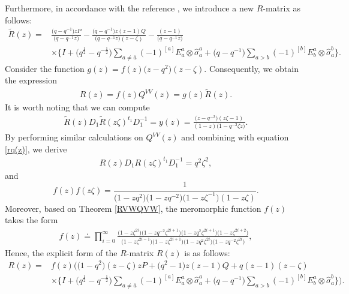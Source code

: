 \documentclass[pdftex]{sigma}
\numberwithin{equation}{section}
\begin{document}
Furthermore, in accordance with the reference \cite{MKMJ}, we introduce a new $R$-matrix as follows:
\begin{align}\label{R1}
 \widetilde{R}(z)={}&\frac{\bigl(q-q^{-1}\bigr)zP}{\bigl(q-q^{-1}z\bigr)}-\frac{\bigl(q-q^{-1}\bigr)z(z-1)Q}{\bigl(q-q^{-1}z\bigr)(z-\zeta)}-\frac{(z-1)}{\bigl(q-q^{-1}z\bigr)}
\nonumber\\
 &\times\biggl\{I+\bigl(q^{\frac{1}{2}}-q^{-\frac{1}{2}}\bigr)\sum\limits_{a\neq \overline{a}}(-1)^{[a]}E^a_a\otimes\hat{\sigma}^a_a+\bigl(q-q^{-1}\bigr)\sum\limits_{a> b}(-1)^{[b]}E^a_b\otimes \hat{\sigma}^b_a\biggr\}.
\end{align}
Consider the function $g(z)=f(z)\bigl(z-q^2\bigr)(z-\zeta)$. Consequently, we obtain the expression
\begin{gather}\label{rq(z)}
 R(z)=f(z)Q^{VV}(z)=g(z)\widetilde{R}(z).
\end{gather}
It is worth noting that we can compute
\begin{gather}
\label{d7}
 \widetilde{R}(z)D_1\widetilde{R}(z\zeta)^{t_1}D_1^{-1}=y(z)=\frac{\bigl(z-q^{-2}\bigr)(z\zeta-1)}{(1-z)\bigl(1-q^{-2}\zeta z\bigr)}.
\end{gather}
By performing similar calculations on $Q^{VV}(z)$ and combining with equation \eqref{rq(z)}, we derive
\begin{gather}\label{d6}
R(z)D_1R(z\zeta)^{t_1}D_1^{-1}=q^2\zeta^2,
\end{gather}
and
\[
 f(z)f(z\zeta)=\frac{1}{\bigl(1-zq^2\bigr)\bigl(1-zq^{-2}\bigr)\bigl(1-z\zeta^{-1}\bigr)(1-z\zeta)}.
\]
Moreover, based on Theorem \ref{RVWQVW}, the meromorphic function $f(z)$ takes the form
\begin{gather*}
 f(z)\doteq \prod\limits_{i=0}^{\infty}\frac{\bigl(1-z\zeta^{2i}\bigr)\bigl(1-zq^{-2}\zeta^{2i+1}\bigr)\bigl(1-zq^{2}\zeta^{2i+1}\bigr)\bigl(1-z\zeta^{2i+2}\bigr)} {\bigl(1-z\zeta^{2i-1}\bigr)\bigl(1-z\zeta^{2i+1}\bigr)\bigl(1-zq^{2}\zeta^{2i}\bigr)\bigl(1-zq^{-2}\zeta^{2i}\bigr)},
\end{gather*}
Hence, the explicit form of the $R$-matrix $R(z)$ is as follows:
\begin{align*}%
 R(z)={}&f(z)\bigl(\bigl(1-q^{2}\bigr)(z-\zeta)zP+\bigl(q^2-1\bigr)z(z-1)Q+q(z-1)(z-\zeta)\\
 &\times\biggl\{I+
\bigl(q^{\frac{1}{2}}-q^{-\frac{1}{2}}\bigr)\sum\limits_{a\neq \overline{a}}(-1)^{[a]}E^a_a\otimes\hat{\sigma}^a_a+\bigl(q-q^{-1}\bigr)\sum\limits_{a> b}(-1)^{[b]}E^a_b\otimes \hat{\sigma}^b_a\biggr\}\biggr).
\end{align*}
\end{document}
